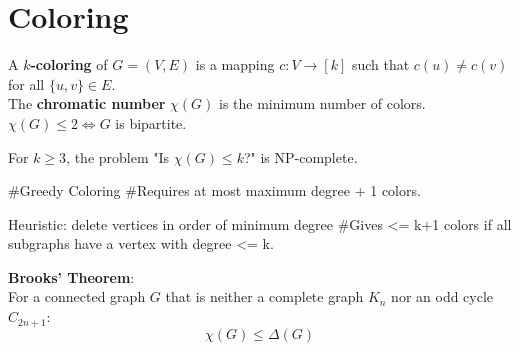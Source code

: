 \section{Coloring}

\begin{definition}

    A \textbf{$k$-coloring} of $G = (V, E)$ is a mapping $c: V \to [k]$ such that $c(u) \neq c(v)$ for all
    $\{u,v\} \in E$.
    \\

    The \textbf{chromatic number} $\chi(G)$ is the minimum number of colors.
    \\

    $\chi(G) \le 2 \iff G$ is bipartite.
    
\end{definition}

\begin{theorem}

    For $k \ge 3$, the problem "Is $\chi(G) \le k$?" is NP-complete.
    
\end{theorem}

\begin{algorithm}

#Greedy Coloring
#Requires at most maximum degree + 1 colors.

Heuristic: 
delete vertices in order of minimum degree
#Gives <= k+1 colors if all subgraphs have a vertex with degree <= k.
    
\end{algorithm}

\begin{theorem}

\textbf{Brooks' Theorem}:\\

    For a connected graph $G$ that is neither a complete graph $K_n$ nor an odd cycle $C_{2n+1}$:
    $$\chi(G) \le \Delta(G)$$
    
\end{theorem}

